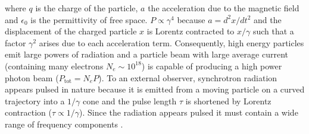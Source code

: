 \documentclass[../main.tex]{subfiles}
\begin{document}
where $q$ is the charge of the particle, $a$ the acceleration due to the magnetic field and $\epsilon_{0}$ is the permittivity of free space. $P \propto \gamma^{4}$ because $a = d^{2}x/dt^{2}$ and the displacement of the charged particle $x$ is Lorentz contracted to $x/\gamma$ such that a factor $\gamma^{2}$ arises due to each acceleration term. Consequently, high energy particles emit large powers of radiation and a particle beam with large average current (containing many electrons $N_{e}\sim 10^{18}$) is capable of producing a high power photon beam ($P_{\mathrm{tot}}=N_{e}P$). To an external observer, synchrotron radiation appears pulsed in nature because it is emitted from a moving particle on a curved trajectory into a $1/\gamma$ cone and the pulse length $\tau$ is shortened by Lorentz contraction ($\tau \propto 1/\gamma$). Since the radiation appears pulsed it must contain a wide range of frequency components \cite{appleby2020science}.  
\end{document}
